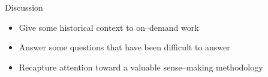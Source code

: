 \documentclass[presentation]{subfiles}
\begin{document}
\begin{frame}{Discussion}
\begin{itemize}
  \item Give some historical context to \alert{on--demand work}
  \item Answer some questions that have been difficult to answer
  \item Recapture attention toward a valuable sense--making methodology
\end{itemize}
\end{frame}
\end{document}
